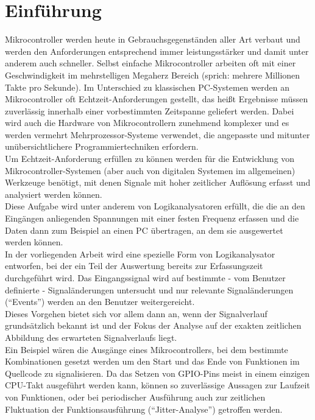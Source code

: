 \chapter{Einführung}

\label{ch:Einfuehrung}

Mikrocontroller werden heute in Gebrauchsgegenständen aller Art verbaut und werden den Anforderungen entsprechend immer leistungsstärker und damit unter anderem auch schneller. Selbst einfache Mikrocontroller arbeiten oft mit einer Geschwindigkeit im mehrstelligen Megaherz Bereich (sprich: mehrere Millionen Takte pro Sekunde). Im Unterschied zu klassischen PC-Systemen werden an Mikrocontroller oft Echtzeit-Anforderungen gestellt, das heißt Ergebnisse müssen zuverlässig innerhalb einer vorbestimmten Zeitspanne geliefert werden\cite{wiki:echtzeit}. Dabei wird auch die Hardware von Mikrocontrollern zunehmend komplexer und es werden vermehrt Mehrprozessor-Systeme verwendet, die angepasste und mitunter unübersichtlichere Programmiertechniken erfordern.\\ 
Um Echtzeit-Anforderung erfüllen zu können werden für die Entwicklung von Mikrocontroller-Systemen (aber auch von digitalen Systemen im allgemeinen) Werkzeuge benötigt, mit denen Signale mit hoher zeitlicher Auflösung erfasst und analysiert werden können.\\
Diese Aufgabe wird unter anderem von Logikanalysatoren erfüllt, die die an den Eingängen anliegenden Spannungen mit einer festen Frequenz erfassen und die Daten dann zum Beispiel an einen PC übertragen, an dem sie ausgewertet werden können.\\
In der vorliegenden Arbeit wird eine spezielle Form von Logikanalysator entworfen, bei der ein Teil der Auswertung bereits zur Erfassungszeit durchgeführt wird. Das Eingangssignal wird auf bestimmte - vom Benutzer definierte - Signaländerungen untersucht und nur relevante Signaländerungen (``Events'') werden an den Benutzer weitergereicht.\\
Dieses Vorgehen bietet sich vor allem dann an, wenn der Signalverlauf grundsätzlich bekannt ist und der Fokus der Analyse auf der exakten zeitlichen Abbildung des erwarteten Signalverlaufs liegt.\\
Ein Beispiel wären die Ausgänge eines Mikrocontrollers, bei dem bestimmte Kombinationen gesetzt werden um den Start und das Ende von Funktionen im Quellcode zu signalisieren. Da das Setzen von GPIO-Pins meist in einem einzigen CPU-Takt ausgeführt werden kann, können so zuverlässige Aussagen zur Laufzeit von Funktionen, oder bei periodischer Ausführung auch zur zeitlichen Fluktuation der Funktionsausführung (``Jitter-Analyse'') getroffen werden.

